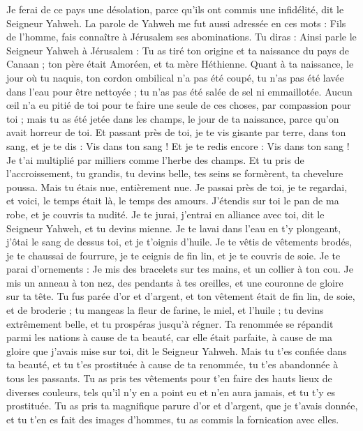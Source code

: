 \begin{multicols}{2}
Je ferai de ce pays une désolation, parce qu'ils ont commis une infidélité, dit le Seigneur Yahweh.
\VerseOne{}La parole de Yahweh me fut aussi adressée en ces mots :
Fils de l’homme, fais connaître à Jérusalem ses abominations.
Tu diras : Ainsi parle le Seigneur Yahweh à Jérusalem : Tu as tiré ton origine et ta naissance du pays de Canaan ; ton père était Amoréen, et ta mère Héthienne.
Quant à ta naissance, le jour où tu naquis, ton cordon ombilical n’a pas été coupé, tu n’as pas été lavée dans l'eau pour être nettoyée ; tu n’as pas été salée de sel ni emmaillotée.
Aucun œil  n’a eu pitié de toi pour te faire une seule de ces choses, par compassion pour toi ; mais tu as été jetée dans les champs, le jour de ta naissance, parce qu'on avait horreur de toi.
Et passant près de toi, je te vis gisante par terre, dans ton sang, et je te dis : Vis dans ton sang ! Et je te redis encore : Vis dans ton sang !
Je t'ai multiplié par milliers comme l'herbe des champs. Et tu pris de l’accroissement, tu grandis, tu devins belle, tes seins se formèrent, ta chevelure poussa. Mais tu étais nue, entièrement nue.
Je passai près de toi, je te regardai, et voici, le temps était là, le temps des amours. J'étendis sur toi le pan de ma robe, et je couvris ta nudité. Je te jurai, j'entrai en alliance avec toi, dit le Seigneur Yahweh, et tu devins mienne.
Je te lavai dans l'eau en t'y plongeant, j'ôtai le sang de dessus toi, et je t'oignis d'huile.
Je te vêtis de vêtements brodés, je te chaussai de fourrure, je te ceignis de fin lin, et je te couvris de soie.
Je te parai d'ornements : Je mis des bracelets sur tes mains, et un collier à ton cou.
Je mis un anneau à ton nez, des pendants à tes oreilles, et une couronne de gloire sur ta tête.
Tu fus parée d'or et d'argent, et ton vêtement était de fin lin, de soie, et de broderie ; tu mangeas la fleur de farine, le miel, et l'huile ; tu devins extrêmement belle, et tu prospéras jusqu’à régner.
Ta renommée se répandit parmi les nations à cause de ta beauté, car elle était parfaite, à cause de ma gloire que j'avais mise sur toi, dit le Seigneur Yahweh.
Mais tu t'es confiée dans ta beauté, et tu t'es prostituée à cause de ta renommée, tu t'es abandonnée à tous les passants.
Tu as pris tes vêtements pour t’en faire des hauts lieux de diverses couleurs, tels qu'il n'y en a point eu et n'en aura jamais, et tu t'y es prostituée.
Tu as pris ta magnifique parure d’or et d’argent, que je t'avais donnée, et tu t'en es fait des images d’hommes, tu as commis la fornication avec elles.

\end{multicols}
